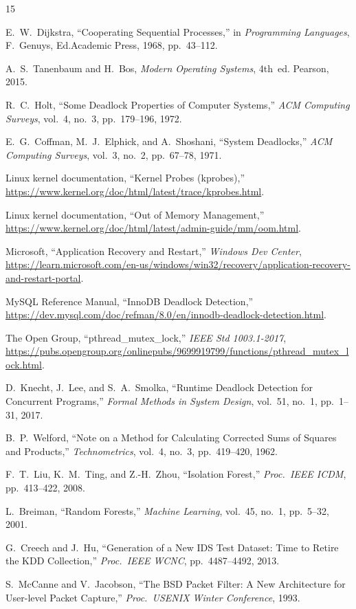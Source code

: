 \documentclass[11pt,letterpaper]{article}
\begin{document}
\begin{thebibliography}{15}

E.~W.~Dijkstra, ``Cooperating Sequential Processes,'' in
\emph{Programming Languages}, F.~Genuys, Ed.\@ Academic Press, 1968,
pp.~43--112.

A.~S.~Tanenbaum and H.~Bos, \emph{Modern Operating Systems}, 4th~ed.\@
Pearson, 2015.

R.~C.~Holt, ``Some Deadlock Properties of Computer Systems,''
\emph{ACM Computing Surveys}, vol.~4, no.~3, pp.~179--196, 1972.

E.~G.~Coffman, M.~J.~Elphick, and A.~Shoshani, ``System Deadlocks,''
\emph{ACM Computing Surveys}, vol.~3, no.~2, pp.~67--78, 1971.

Linux kernel documentation, ``Kernel Probes (kprobes),''
\url{https://www.kernel.org/doc/html/latest/trace/kprobes.html}.

Linux kernel documentation, ``Out of Memory Management,''
\url{https://www.kernel.org/doc/html/latest/admin-guide/mm/oom.html}.

Microsoft, ``Application Recovery and Restart,'' \emph{Windows Dev
Center},
\url{https://learn.microsoft.com/en-us/windows/win32/recovery/application-recovery-and-restart-portal}.

MySQL Reference Manual, ``InnoDB Deadlock Detection,''
\url{https://dev.mysql.com/doc/refman/8.0/en/innodb-deadlock-detection.html}.

The Open Group, ``pthread\_mutex\_lock,'' \emph{IEEE Std 1003.1-2017},
\url{https://pubs.opengroup.org/onlinepubs/9699919799/functions/pthread_mutex_lock.html}.

D.~Knecht, J.~Lee, and S.~A.~Smolka, ``Runtime Deadlock Detection for
Concurrent Programs,'' \emph{Formal Methods in System Design}, vol.~51,
no.~1, pp.~1--31, 2017.

B.~P.~Welford, ``Note on a Method for Calculating Corrected Sums of
Squares and Products,'' \emph{Technometrics}, vol.~4, no.~3,
pp.~419--420, 1962.

F.~T.~Liu, K.~M.~Ting, and Z.-H.~Zhou, ``Isolation Forest,''
\emph{Proc.\ IEEE ICDM}, pp.~413--422, 2008.

L.~Breiman, ``Random Forests,'' \emph{Machine Learning}, vol.~45,
no.~1, pp.~5--32, 2001.

G.~Creech and J.~Hu, ``Generation of a New IDS Test Dataset: Time to
Retire the KDD Collection,'' \emph{Proc.\ IEEE WCNC}, pp.~4487--4492,
2013.

S.~McCanne and V.~Jacobson, ``The BSD Packet Filter: A New Architecture
for User-level Packet Capture,'' \emph{Proc.\ USENIX Winter
Conference}, 1993.

\end{thebibliography}
\end{document}

